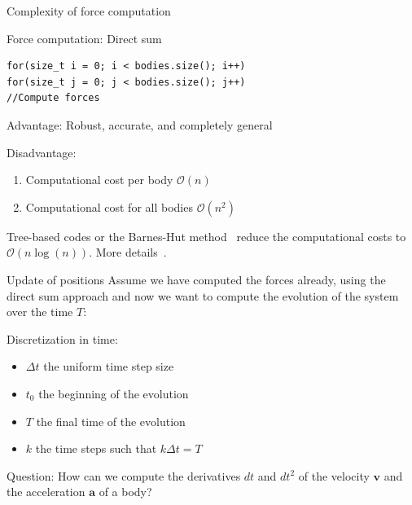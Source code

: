 \documentclass[12pt,t]{beamer}
\begin{document}
\begin{frame}[fragile]{Complexity of force computation}

\begin{block}{Force computation: Direct sum}
\begin{lstlisting}
for(size_t i = 0; i < bodies.size(); i++)
for(size_t j = 0; j < bodies.size(); j++)
//Compute forces
\end{lstlisting}
\end{block}

\begin{block}{Advantage:}
Robust, accurate, and completely general
\end{block}

\begin{block}{Disadvantage:}
\begin{enumerate}
\item Computational cost per body $\mathcal{O}(n)$ 
\item Computational cost for all bodies $\mathcal{O}(n^2)$ 
\end{enumerate}
\end{block}
Tree-based codes or the Barnes-Hut method~\cite{barnes1986hierarchical} reduce the computational costs to $\mathcal{O}(n\log(n))$. More details~\cite{knuth1997art}.
\end{frame}

\begin{frame}{Update of positions}
Assume we have computed the forces already, using the direct sum approach and now we want to compute the evolution of the system over the time $T$:
\begin{block}{Discretization in time:}
\begin{itemize}
\item $\Delta t$ the uniform time step size
\item $t_0$ the beginning of the evolution
\item $T$ the final time of the evolution
\item $k$ the time steps such that $k\Delta t=T$
\end{itemize}
\end{block}
Question: How can we compute the derivatives $dt$ and $dt^2$ of the velocity $\mathbf{v}$ and the acceleration $\mathbf{a}$ of a body?
\end{frame}
\end{document}
